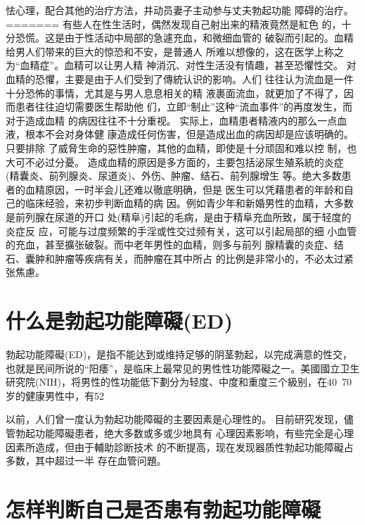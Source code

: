 \documentclass[12pt,UTF8]{ctexbook}
\begin{document}
怯心理，配合其他的治疗方法，并动员妻子主动参与丈夫勃起功能
障碍的治疗。
=======
有些人在性生活时，偶然发现自己射出来的精液竟然是紅色
的，十分恐慌。这是由于性活动中局部的急遽充血，和微细血管的
破裂而引起的。血精给男人们带来的巨大的惊恐和不安，是普通人
所难以想像的，这在医学上称之为“血精症”。血精可以让男人精
神消沉、对性生活没有情趣，甚至恐懼性交。
对血精的恐懼，主要是由于人们受到了傳統认识的影响。人们
往往认为流血是一件十分恐怖的事情，尤其是与男人息息相关的精
液裹面流血，就更加了不得了，因而患者往往迫切需要医生帮助他
们，立即“制止”这种“流血事件”的再度发生，而对于造成血精
的病因往往不十分重视。
实际上，血精患者精液内的那么一点血液，根本不会对身体健
康造成任何伤害，但是造成出血的病因却是应该明确的。只要排除
了威脅生命的惡性肿瘤，其他的血精，即使是十分顽固和难以控
制，也大可不必过分憂。
造成血精的原因是多方面的，主要包括泌尿生殖系統的炎症
(精囊炎、前列腺炎、尿道炎)、外伤、肿瘤、结石、前列腺增生
等。绝大多数患者的血精原因，一时半会儿还难以徹底明确，但是
医生可以凭藉患者的年龄和自己的临床经验，来初步判断血精的病
因。例如青少年和新婚男性的血精，大多数是前列腺在尿道的开口
处(精阜)引起的毛病，是由于精阜充血所致，属于轻度的炎症反
应，可能与过度频繁的手淫或性交过频有关，这可以引起局部的细
小血管的充血，甚至擴张破裂。而中老年男性的血精，则多与前列
腺精囊的炎症、结石、囊肿和肿瘤等疾病有关，而肿瘤在其中所占
的比例是非常小的，不必太过紧张焦慮。

\section{什么是勃起功能障礙(ED)}

勃起功能障礙(ED)，是指不能达到或维持足够的阴茎勃起，以完成满意的性交，也就是民间所说的“阳痿”，是临床上最常见的男性性功能障礙之一。美國國立卫生研究院(NIH)，将男性的性功能低下劃分为轻度、中度和重度三个級别，在40~70岁的健康男性中，有52%

以前，人们曾一度认为勃起功能障礙的主要因素是心理性的。
目前研究发现，儘管勃起功能障礙患者，绝大多数或多或少地具有
心理因素影响，有些完全是心理因素所造成，但由于輔助診断技术
的不断提高，现在发现器质性勃起功能障礙占多数，其中超过一半
存在血管问題。

\section{怎样判断自己是否患有勃起功能障礙}
\end{document}
